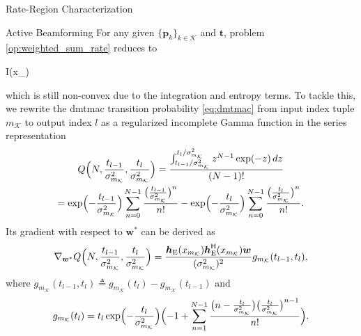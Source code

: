 \documentclass[journal]{IEEEtran}
\begin{document}
\begin{section}{Rate-Region Characterization}
	\begin{subsection}{Active Beamforming}
		For any given $\{\boldsymbol{p}_k\}_{k \in \mathcal{K}}$ and $\boldsymbol{t}$, problem \eqref{op:weighted_sum_rate} reduces to
		\begin{maxi!}
			{}{I(x_{})}{\label{op:active_beamforming}}{\label{ob:active_beamforming}}
			\addConstraint{\eqref{co:transmit_power},}
		\end{maxi!}
		which is still non-convex due to the integration and entropy terms.
		To tackle this, we rewrite the \gls{dmtmac} transition probability \eqref{eq:dmtmac} from input index tuple $m_{\mathcal{K}}$ to output index $l$ as a regularized incomplete Gamma function in the series representation \cite[Theorem 3]{Jameson2016}
		\begin{equation}
			\begin{gathered}
				Q\Bigl(N,\frac{t_{l-1}}{\sigma_{m_{\mathcal{K}}}^2},\frac{t_l}{\sigma_{m_{\mathcal{K}}}^2}\Bigr) = \frac{\int_{{t_{l-1}}/{\sigma_{m_{\mathcal{K}}}^2}}^{{t_l}/{\sigma_{m_{\mathcal{K}}}^2}} z^{N-1} \exp(-z) \, d z}{(N-1)!}\\
				= \exp \Bigl(-\frac{t_{l-1}}{\sigma_{m_{\mathcal{K}}}^2}\Bigr) \sum_{n=0}^{N-1} \frac{\bigl(\frac{t_{l-1}}{\sigma_{m_{\mathcal{K}}}^2}\bigr)^n}{n!} - \exp \Bigl(-\frac{t_l}{\sigma_{m_{\mathcal{K}}}^2}\Bigr) \sum_{n=0}^{N-1} \frac{\bigl(\frac{t_l}{\sigma_{m_{\mathcal{K}}}^2}\bigr)^n}{n!}.
			\end{gathered}
			\label{eq:regularized_incomplete_gamma}
		\end{equation}
		Its gradient with respect to $\boldsymbol{w}^*$ can be derived as
		\begin{equation}
			\nabla_{\boldsymbol{w}^*} Q\Bigl(N,\frac{t_{l-1}}{\sigma_{m_{\mathcal{K}}}^2},\frac{t_l}{\sigma_{m_{\mathcal{K}}}^2}\Bigr) = \frac{\boldsymbol{h}_{\text{E}}(x_{m_{\mathcal{K}}})\boldsymbol{h}_{\text{E}}^\mathsf{H}(x_{m_{\mathcal{K}}})\boldsymbol{w}}{(\sigma_{m_{\mathcal{K}}}^2)^2} g_{m_{\mathcal{K}}}(t_{l-1},t_l),
			\label{eq:regularized_incomplete_gamma_gradient}
		\end{equation}
		where $g_{m_{\mathcal{K}}}(t_{l-1},t_l) \triangleq g_{m_{\mathcal{K}}}(t_l)-g_{m_{\mathcal{K}}}(t_{l-1})$ and
		\begin{equation}
			g_{m_{\mathcal{K}}}(t_l) = t_l\exp\Bigl(-\frac{t_l}{\sigma_{m_{\mathcal{K}}}^2}\Bigr)\Bigl(-1+\sum_{n=1}^{N-1} \frac{\bigl(n - \frac{t_l}{\sigma_{m_{\mathcal{K}}}^2}\bigr) \bigl(\frac{t_l}{\sigma_{m_{\mathcal{K}}}^2}\bigr)^{n-1}}{n!}\Bigr).

\end{equation}
\end{subsection}
\end{section}
\end{document}
